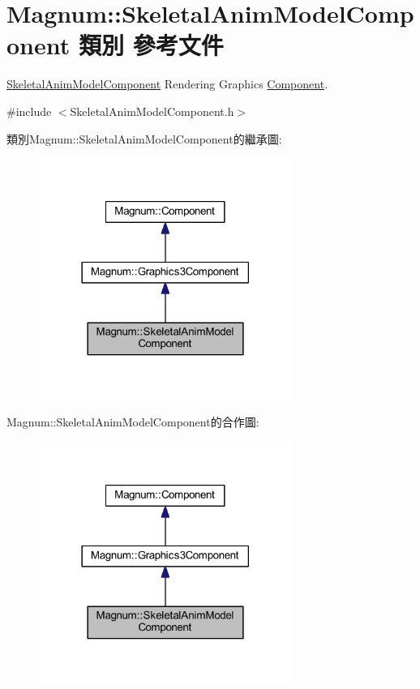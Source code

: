 \hypertarget{class_magnum_1_1_skeletal_anim_model_component}{}\section{Magnum\+:\+:Skeletal\+Anim\+Model\+Component 類別 參考文件}
\label{class_magnum_1_1_skeletal_anim_model_component}


\hyperlink{class_magnum_1_1_skeletal_anim_model_component}{Skeletal\+Anim\+Model\+Component} Rendering Graphics \hyperlink{class_magnum_1_1_component}{Component}.  




{\ttfamily \#include $<$Skeletal\+Anim\+Model\+Component.\+h$>$}



類別\+Magnum\+:\+:Skeletal\+Anim\+Model\+Component的繼承圖\+:\nopagebreak
\begin{figure}[H]
\begin{center}
\leavevmode
\includegraphics[width=234pt]{class_magnum_1_1_skeletal_anim_model_component__inherit__graph}
\end{center}
\end{figure}


Magnum\+:\+:Skeletal\+Anim\+Model\+Component的合作圖\+:\nopagebreak
\begin{figure}[H]
\begin{center}
\leavevmode
\includegraphics[width=234pt]{class_magnum_1_1_skeletal_anim_model_component__coll__graph}
\end{center}
\end{figure}
